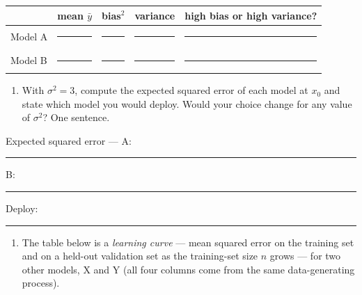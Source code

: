 \documentclass[
  11pt,
]{article}
\newcounter{none} %
\providecommand{\tightlist}{%
  \setlength{\itemsep}{0pt}\setlength{\parskip}{0pt}}
\newcommand{\answerspace}[1]{\par\vspace*{#1}}  %
\newcommand{\blank}[1][1.2in]{\rule{#1}{0.4pt}}
\newcommand{\answerpage}{\clearpage}
\begin{document}
{\def\LTcaptype{none} %
\begin{longtable}[]{@{}
  >{\raggedright\arraybackslash}p{}
  >{\raggedright\arraybackslash}p{}
  >{\raggedright\arraybackslash}p{}
  >{\raggedright\arraybackslash}p{}
  >{\raggedright\arraybackslash}p{}@{}}
\toprule\noalign{}
\begin{minipage}[b]{\linewidth}\raggedright
\end{minipage} & \begin{minipage}[b]{\linewidth}\raggedright
mean \(\bar y\)
\end{minipage} & \begin{minipage}[b]{\linewidth}\raggedright
bias\(^2\)
\end{minipage} & \begin{minipage}[b]{\linewidth}\raggedright
variance
\end{minipage} & \begin{minipage}[b]{\linewidth}\raggedright
high bias or high variance?
\end{minipage} \\
\midrule\noalign{}
\endhead
\bottomrule\noalign{}
\endlastfoot
Model A & \blank[0.7in] & \blank[0.7in] & \blank[0.7in] &
\blank[1.4in] \\
Model B & \blank[0.7in] & \blank[0.7in] & \blank[0.7in] &
\blank[1.4in] \\
\end{longtable}
}

\answerspace{2.5in}

\begin{enumerate}
\def\labelenumi{(\alph{enumi})}
\setcounter{enumi}{1}
\tightlist
\item
  With \(\sigma^2 = 3\), compute the expected squared error of each
  model at \(x_0\) and state which model you would deploy. Would your
  choice change for any value of \(\sigma^2\)? One sentence.
\end{enumerate}

Expected squared error --- A: \blank[0.8in]\quad B:
\blank[0.8in]\quad Deploy: \blank[0.8in]

\answerspace{1.5in}
\answerpage

\begin{enumerate}
\def\labelenumi{(\alph{enumi})}
\setcounter{enumi}{2}
\tightlist
\item
  The table below is a \emph{learning curve} --- mean squared error on
  the training set and on a held-out validation set as the training-set
  size \(n\) grows --- for two other models, X and Y (all four columns
  come from the same data-generating process).
\end{enumerate}
\end{document}
